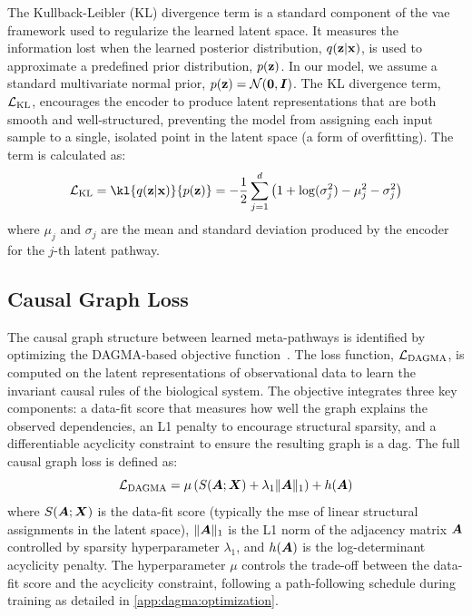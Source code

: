 The Kullback-Leibler (KL) divergence term is a standard component of the \gls{vae} framework used to regularize the learned latent space.
It measures the information lost when the learned posterior distribution, $q({\mathbf{z}}|{\mathbf{x}})$, is used to approximate a predefined prior distribution, $p({\mathbf{z}})$.
In our model, we assume a standard multivariate normal prior, $p(\latentvars) = \normaldist(\vect{0}, \identitymatrix)$.
The KL divergence term, $\mathcal{L}_{\text{KL}}$, encourages the encoder to produce latent representations that are both smooth and well-structured, preventing the model from assigning each input sample to a single, isolated point in the latent space (a form of overfitting).
The term is calculated as:
\begin{equation}
    \kldloss = \kl{q(\latentvars|\variables)}{p(\latentvars)} = -\frac{1}{2} \sum_{j=1}^{\latentdim} \left( 1 + \log(\sigma_j^2) - \mu_j^2 - \sigma_j^2 \right)
    \label{eq:app:kld}
\end{equation}
where $\mu_j$ and $\sigma_j$ are the mean and standard deviation produced by the encoder for the $j$-th latent pathway.

\subsection{Causal Graph Loss}
\label{app:metrics:dagma}

The causal graph structure between learned meta-pathways is identified by optimizing the DAGMA-based objective function~\citep{bello2022dagma}.
The loss function, $\mathcal{L}_{\text{DAGMA}}$, is computed on the latent representations of observational data to learn the invariant causal rules of the biological system.
The objective integrates three key components: a data-fit score that measures how well the graph explains the observed dependencies, an L1 penalty to encourage structural sparsity, and a differentiable acyclicity constraint to ensure the resulting graph is a \gls{dag}.
The full causal graph loss is defined as:
\begin{equation}
    \mathcal{L}_{\text{DAGMA}} = \mu \left( S({\bm{A}}; {\bm{X}}) + \lambda_1 \|{\bm{A}}\|_1 \right) + h({\bm{A}})
    \label{eq:app:dagma_loss_full}
\end{equation}
where $S({\bm{A}}; {\bm{X}})$ is the data-fit score (typically the \gls{mse} of linear structural assignments in the latent space), $\|{\bm{A}}\|_1$ is the L1 norm of the adjacency matrix ${\bm{A}}$ controlled by sparsity hyperparameter $\lambda_1$, and $h({\bm{A}})$ is the log-determinant acyclicity penalty.
The hyperparameter $\mu$ controls the trade-off between the data-fit score and the acyclicity constraint, following a path-following schedule during training as detailed in \cref{app:dagma:optimization}.

